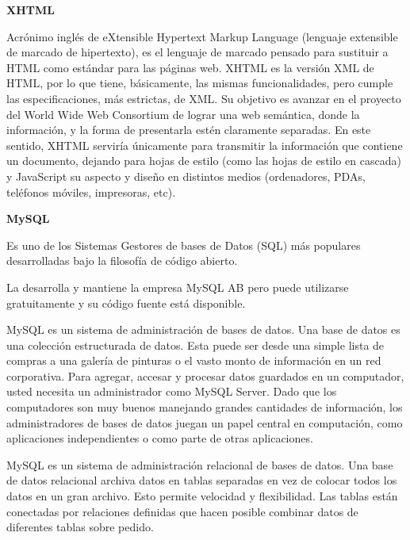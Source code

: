 \documentclass[12pt,letterpaper,oneside]{article}
\begin{document}
\bigskip

{\bfseries
XHTML}

Acrónimo inglés de eXtensible Hypertext Markup Language (lenguaje
extensible de marcado de hipertexto), es el lenguaje de marcado pensado
para sustituir a HTML como estándar para las páginas web. XHTML es
la versión XML de HTML, por lo que tiene, básicamente, las mismas
funcionalidades, pero cumple las especificaciones, más estrictas, de
XML. Su objetivo es avanzar en el proyecto del World Wide Web
Consortium de lograr una web semántica, donde la información, y la
forma de presentarla estén claramente separadas. En este sentido,
XHTML serviría únicamente para transmitir la información que
contiene un documento, dejando para hojas de estilo (como las hojas de
estilo en cascada) y JavaScript su aspecto y diseño en distintos
medios (ordenadores, PDAs, teléfonos móviles, impresoras, etc).


\bigskip


\bigskip

{\bfseries
MySQL}

\textmd{E}s uno de los Sistemas Gestores de bases de Datos (SQL) más
populares desarrolladas bajo la filosofía de código abierto.

La desarrolla y mantiene la empresa MySQL AB pero puede utilizarse
gratuitamente y su código fuente está disponible.


\bigskip

MySQL es un sistema de administración de bases de datos. Una base de
datos es una colección estructurada de datos. Esta puede ser desde
una simple lista de compras a una galería de pinturas o el vasto
monto de información en un red corporativa. Para agregar, accesar y
procesar datos guardados en un computador, usted necesita un
administrador como MySQL Server. Dado que los computadores son muy
buenos manejando grandes cantidades de información, los
administradores de bases de datos juegan un papel central en
computación, como aplicaciones independientes o como parte de otras
aplicaciones.


\bigskip

MySQL es un sistema de administración relacional de bases de datos.
Una base de datos relacional archiva datos en tablas separadas en vez
de colocar todos los datos en un gran archivo. Esto permite velocidad y
flexibilidad. Las tablas están conectadas por relaciones definidas
que hacen posible combinar datos de diferentes tablas sobre pedido.


\bigskip
\end{document}
